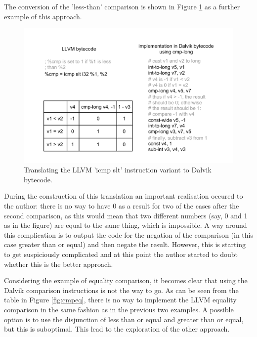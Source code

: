 \documentclass[parskip]{cs4rep}
\begin{document}
The conversion of the 'less-than' comparison is shown in Figure \ref{fig:cmpslt} as a further example of this approach.

\begin{figure}[h!]
    \centering
        \includegraphics[width=1.0\textwidth]{cmpslt}
    \caption{Translating the LLVM 'icmp slt' instruction variant to Dalvik bytecode.}
    \label{fig:cmpslt}
\end{figure}

During the construction of this translation an important realisation occured to the author: there is no way to have 0 as a result for two of the cases after the second comparison, as this would mean that two different numbers (say, 0 and 1 as in the figure) are equal to the same thing, which is impossible. A way around this complication is to output the code for the negation of the comparison (in this case greater than or equal) and then negate the result. However, this is starting to get suspiciously complicated and at this point the author started to doubt whether this is the better approach.

Considering the example of equality comparison, it becomes clear that using the Dalvik comparison instructions is not the way to go. As can be seen from the table in Figure \ref{fig:cmpeq}, there is no way to implement the LLVM equality comparison in the same fashion as in the previous two examples. A possible option is to use the disjunction of less than or equal and greater than or equal, but this is suboptimal. This lead to the exploration of the other approach.
\end{document}
